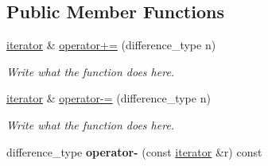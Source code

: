 \subsection*{Public Member Functions}
\begin{DoxyCompactItemize}
\item 
\hyperlink{classcircularDeque_1_1iterator}{iterator} \& \hyperlink{classcircularDeque_1_1iterator_adab937de09a3bebfc08b5bdc13ab55c5}{operator+=} (difference\+\_\+type n)
\begin{DoxyCompactList}\small\item\em Write what the function does here. \end{DoxyCompactList}\item 
\hyperlink{classcircularDeque_1_1iterator}{iterator} \& \hyperlink{classcircularDeque_1_1iterator_ae465975e1491a6cb84a890ae8a762eea}{operator-\/=} (difference\+\_\+type n)
\begin{DoxyCompactList}\small\item\em Write what the function does here. \end{DoxyCompactList}\item 
\hypertarget{classcircularDeque_1_1iterator_aec2396234b3a5d2d1449c5e83619917d}{difference\+\_\+type {\bfseries operator-\/} (const \hyperlink{classcircularDeque_1_1iterator}{iterator} \&r) const }\label{classcircularDeque_1_1iterator_aec2396234b3a5d2d1449c5e83619917d}


\end{DoxyCompactItemize}
